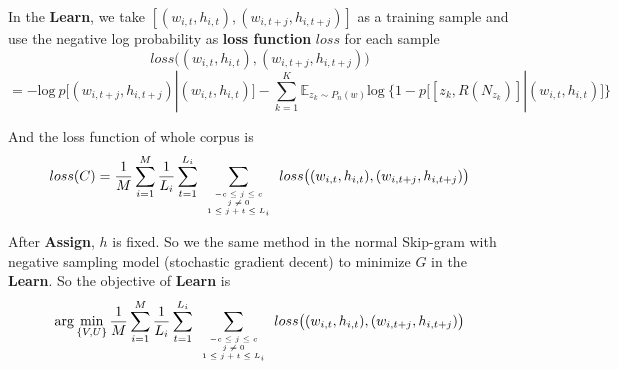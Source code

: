 In the \textbf{Learn}, we take $[ (w_{i,t},h_{i,t}),(w_{i,t+j},h_{i,t+j})]$ as a training sample and use the negative log probability as \textbf{loss function} $loss$ for each sample 
$$loss\big ( (w_{i,t},h_{i,t}),(w_{i,t+j},h_{i,t+j})\big )$$
$$ = -\mathrm{log}\ p\Big [(w_{i,t+j},h_{i,t+j})|(w_{i,t},h_{i,t})\Big ]-\sum\limits_{k=1}^K\mathbb{E}_{z_k\sim P_n(w)}\mathrm{log}\ \Big \{1-p\Big[[z_k,R(N_{z_k})]|(w_{i,t},h_{i,t})\Big ] \Big \}$$ 

And the loss function of whole corpus is $$loss(C)=\frac{1}{M}\sum_{i=1}^M\frac{1}{L_i}\sum_{t=1}^{L_i}\sum\limits_{\mbox{\tiny$\begin{array}{c}-c\leq j \leq c\\ j\neq 0\\ 1\leq j+t\leq L_i\end{array}$}}loss\big ( (w_{i,t},h_{i,t}),(w_{i,t+j},h_{i,t+j})\big )$$

	After \textbf{Assign}, $h$ is fixed. So we the same method in the normal Skip-gram with negative sampling model (stochastic gradient decent) to minimize $G$ in the \textbf{Learn}. So the objective of \textbf{Learn} is 
	$$\arg\min_{\{V,U\}} \frac{1}{M}\sum_{i=1}^M\frac{1}{L_i}\sum_{t=1}^{L_i}\sum\limits_{\mbox{\tiny$\begin{array}{c}-c\leq j \leq c\\ j\neq 0\\ 1\leq j+t\leq L_i\end{array}$}}loss\big ( (w_{i,t},h_{i,t}),(w_{i,t+j},h_{i,t+j})\big )$$
	
	
	
